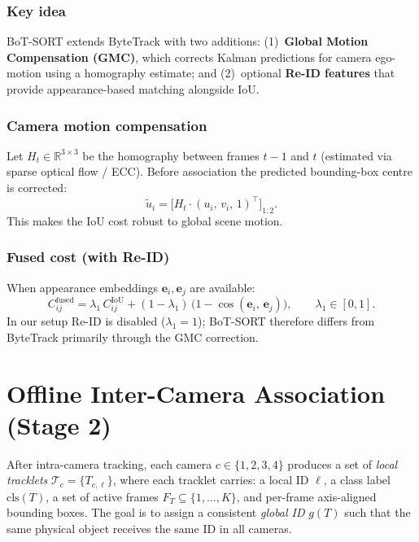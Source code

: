 \documentclass[11pt,a4paper]{article}
\begin{document}
\subsubsection*{Key idea}
BoT-SORT extends ByteTrack with two additions: (1)~\textbf{Global Motion
Compensation (GMC)}, which corrects Kalman predictions for camera ego-motion
using a homography estimate; and (2)~optional \textbf{Re-ID features} that
provide appearance-based matching alongside IoU.

\subsubsection*{Camera motion compensation}
Let $H_t \in \mathbb{R}^{3\times 3}$ be the homography between frames $t-1$
and $t$ (estimated via sparse optical flow / ECC).  Before association the
predicted bounding-box centre is corrected:
\begin{equation}
  \tilde{u}_i = \bigl[H_t \cdot (u_i,\, v_i,\, 1)^\top\bigr]_{1:2}.
\end{equation}
This makes the IoU cost robust to global scene motion.

\subsubsection*{Fused cost (with Re-ID)}
When appearance embeddings $\mathbf{e}_i, \mathbf{e}_j$ are available:
\begin{equation}
  C^{\text{fused}}_{ij}
  = \lambda_1\,C^{\text{IoU}}_{ij}
  + (1-\lambda_1)\,\bigl(1 - \cos(\mathbf{e}_i,\,\mathbf{e}_j)\bigr),
  \qquad \lambda_1 \in [0,1].
\end{equation}
In our setup Re-ID is disabled ($\lambda_1 = 1$); BoT-SORT therefore differs
from ByteTrack primarily through the GMC correction.

\section{Offline Inter-Camera Association (Stage 2)}

After intra-camera tracking, each camera $c \in \{1,2,3,4\}$ produces a set
of \emph{local tracklets}
$\mathcal{T}_c = \{T_{c,\ell}\}$, where each tracklet carries:
a local ID $\ell$, a class label $\text{cls}(T)$, a set of active frames
$F_T \subseteq \{1,\ldots,K\}$, and per-frame axis-aligned bounding boxes.
The goal is to assign a consistent \emph{global ID} $g(T)$ such that the
same physical object receives the same ID in all cameras.
\end{document}
